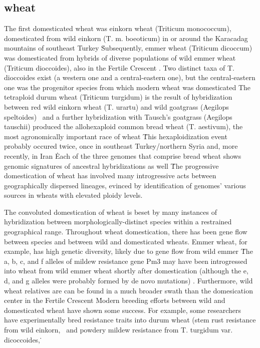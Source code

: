 \documentclass[11pt]{article}
\begin{document}
\subsection*{wheat}

The first domesticated wheat was einkorn wheat (Triticum monococcum), domesticated from wild einkorn (T. m. boeoticum) in or around the Karacadag mountains of southeast Turkey \cite{heun1997site, harlan1966distribution, ozkan2002aflp}\.
Subsequently, emmer wheat (Triticum dicoccum) was domesticated from hybrids of diverse populations of wild emmer wheat (Triticum dioccoides), also in the Fertile Crescent \cite{lev2000cradle, civavn2013reticulated, luo2007structure, ozkan2002aflp}.
Two distinct taxa of T. dioccoides exist (a western one and a central-eastern one), but the central-eastern one was the progenitor species from which modern wheat was domesticated \cite{ozkan2005reconsideration}
The tetraploid durum wheat (Triticum turgidum) is the result of hybridization between red wild einkorn wheat (T. urartu) and wild goatgrass (Aegilops speltoides) \cite{mcfadden1946origin, petersen2006phylogenetic}\, and a further hybridization with Tausch's goatgrass (Aegilops tauschii) produced the allohexaploid common bread wheat (T. aestivum), the most agronomically important race of wheat \cite{salamini2002genetics, hancock2012plant, dvorak2006molecular}\.
This hexaploidization event probably occured twice, once in southeast Turkey/northern Syria and, more recently, in Iran \cite{giles2006gludy}\.
Each of the three genomes that comprise bread wheat shows genomic signatures of ancestral hybridizations as well \cite{marcussen2014ancient}\.

The progressive domestication of wheat has involved many introgressive acts between geographically dispersed lineages, evinced by identification of genomes' various sources in wheats with elevated ploidy levels.

The convoluted domestication of wheat is beset by many instances of hybridization between morphologically-distinct species within a restrained geographical range.
Throughout wheat domestication, there has been gene flow between species and between wild and domesticated wheats.
Emmer wheat, for example, has high genetic diversity, likely due to gene flow from wild emmer \cite{luo2007structure, dvorak2006molecular}\.
The a, b, c, and f alleles of mildew resistance gene Pm3 may have been introgressed into wheat from wild emmer wheat shortly after domestication (although the e, d, and g alleles were probably formed by de novo mutations) \cite{TPJ:TPJ2772}.
Furthermore, wild wheat relatives are can be found in a much broader swath than the domesication center in the Fertile Crescent \cite{CWR}\.
Modern breeding efforts between wild and domesticated wheat have shown some success.
For example, some researchers have experimentally bred resistance traits into durum wheat (stem rust resistance from wild einkorn, \cite{gerechter1971transfer}\, and powdery mildew resistance from T. turgidum var. dicoccoides, \cite{blanco2008molecular}\.
\end{document}
